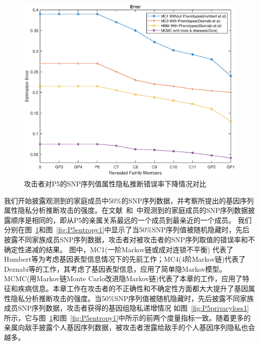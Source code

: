 \begin{figure}[htbp]
	\centering
	\includegraphics[width=0.8\linewidth]{./figures/P5error1.eps}
	\centering
	\caption{攻击者对P5的SNP序列值属性隐私推断错误率下降情况对比}\label{fig:P5error1}
\end{figure}


我们开始披露观测到的家庭成员中50\%的SNP序列数据，并考察所提出的基因序列属性隐私分析推断攻击的强度。在文献~\cite{humbert2013addressing,humbert2017quantifying}和~\cite{deznabi2018inference}中观测到的家庭成员的SNP序列数据披露顺序是相同的，即从P5的亲属关系最远的一个成员到最亲近的一个成员。 我们分别在图~\ref{fig:P5error1}和图~\ref{fig:P5entropy1}中显示了当50\%SNP序列值被随机隐藏时，先后披露不同家族成员SNP序列数据，攻击者对被攻击者的SNP序列取值的错误率和不确定性递减的结果。 图中，MC1(一阶Markov链或成对连锁不平衡) 代表了Humbert等为考虑基因表型信息情况下的先前工作；MC4(4阶Markov链)代表了Deznabi等的工作，其考虑了基因表型信息，应用了简单隐Markov模型。MCMC(用Markov链Monte Carlo改进隐Markov链)代表了本章的工作，应用了特征和疾病信息。本章工作在攻击者的不正确性和不确定性方面都大大提升了基因属性隐私分析推断攻击的强度。当50\%SNP序列值被随机隐藏时，先后披露不同家族成员SNP序列数据，攻击者获得的基因组隐私递增情况 如图~\ref{fig:P5privacyloss1}所示，它与图~\ref{fig:P5error1}和图~\ref{fig:P5entropy1}中所示的前两个度量指标一致。随着更多的亲属向敌手披露个人基因序列数据，被攻击者泄露给敌手的个人基因序列隐私也会越多。

